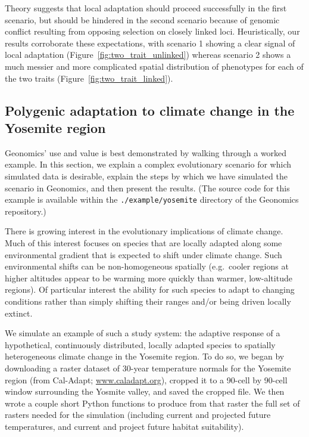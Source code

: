 ﻿\documentclass{article}
\begin{document}
Theory suggests that local adaptation should proceed successfully in the first scenario, but should be
hindered in the second scenario because of genomic conflict resulting from opposing selection
on closely linked loci.
Heuristically, our results corroborate these expectations, with scenario 1 showing a clear
signal of local adaptation (Figure~\ref{fig:two_trait_unlinked}) whereas scenario 2 shows a much messier and more complicated
spatial distribution of phenotypes for each of the two traits (Figure~\ref{fig:two_trait_linked}).


\subsection{Polygenic adaptation to climate change in the Yosemite region}
Geonomics' use and value is best demonstrated by walking through a worked example.
In this section, we explain a complex evolutionary scenario for which 
simulated data is desirable, explain the steps by which we have simulated the
scenario in Geonomics, and then present the results.
(The source code for this example is available within the
\texttt{./example/yosemite} directory of the Geonomics repository.)

There is growing interest in the evolutionary implications of climate change.
Much of this interest focuses on species that are locally adapted along some
environmental gradient that is expected to shift under climate change.
Such environmental shifts can be non-homogeneous spatially
(e.g.\ cooler regions at higher altitudes appear to be warming more
quickly than warmer, low-altitude regions).
Of particular interest the ability for such species to adapt
to changing conditions rather than simply shifting their ranges
and/or being driven locally extinct.

We simulate an example of such a study system: the adaptive
response of a hypothetical, continuously distributed, locally adapted species
to spatially heterogeneous climate change in the Yosemite region.
To do so, we began by downloading a raster dataset of 30-year
temperature normals for the Yosemite region (from Cal-Adapt; \url{www.caladapt.org}),
cropped it to a 90-cell by 90-cell window surrounding the Yosmite valley,
and saved the cropped file.
We then wrote a couple short Python functions to produce from that raster
the full set of rasters needed for the simulation
(including current and projected future temperatures,
and current and project future habitat suitability).
\end{document}
